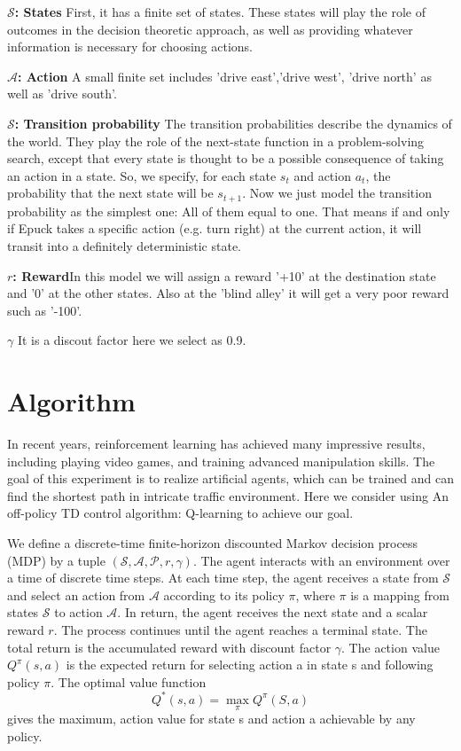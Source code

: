 \documentclass[a4paper, 11pt]{article} %
\begin{document}
\textbf{$\mathcal{S}$: States} \quad First, it has a finite set of states. These states will play the role of outcomes in the decision theoretic approach, as well as providing whatever information is necessary for choosing actions. 

\textbf{$\mathcal{A}$: Action}\quad 
A small finite set includes 'drive east','drive west', 'drive north' as well as 'drive south'.

\textbf{$\mathcal{S}$: Transition probability}\quad 
The transition probabilities describe the dynamics of the world. They play the role of the next-state function in a problem-solving search, except that every state is thought to be a possible consequence of taking an action in a state. So, we specify, for each state $s_{t}$ and action $a_{t}$, the probability that the next state will be $s_{t+1}$. 
Now we just model the transition probability as the simplest one: All of them equal to one. That means if and only if Epuck takes a specific action (e.g. turn right) at the current action, it will transit into a definitely deterministic state.

\textbf{$r$: Reward}\quad  In this model we will assign a reward '+10' at the destination state and '0' at the other states. 
Also at the 'blind alley' it will get a very poor reward such as '-100'.

\textbf{$\gamma$}  \quad It is a discout factor here we select as 0.9.


\section{Algorithm}
In recent years, reinforcement learning has achieved many impressive results, including playing video games, and training advanced manipulation skills. The goal of this experiment is to realize artificial agents, which can be trained and can find the shortest path in intricate traffic environment. Here we consider using An off-policy TD control algorithm: Q-learning to achieve our goal.


We define a discrete-time finite-horizon discounted Markov decision process (MDP) by a tuple $(\mathcal{S,A,P}, r,\gamma)$. The agent interacts with an environment over a time of discrete time steps. At each time step, the agent receives a state from $\mathcal{S}$ and select an action from $\mathcal{A}$ according to its policy $\pi$, where $\pi$ is a mapping from states $\mathcal{S}$ to action $\mathcal{A}$. In return, the agent receives the next state and a scalar reward $r$. The process continues until the agent reaches a terminal state. The total return is the accumulated reward with discount factor $\gamma$. The action value $Q^{\pi}(s,a)$ is the expected return for selecting action a in state s and following policy $\pi$. The optimal value function $$Q^*(s,a)=\max \limits_{\pi}Q^{\pi}(S,a)$$ gives the maximum, action value for state s and action a achievable by any policy.
\end{document}
